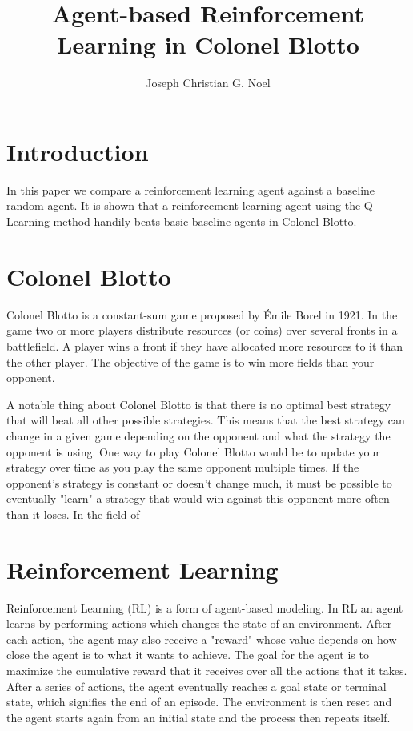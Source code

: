 \documentclass[11pt, oneside]{article}   	%
\title{Agent-based Reinforcement Learning in Colonel Blotto}
\author{Joseph Christian G. Noel}
\date{}							%
\begin{document}
\maketitle

\section{Introduction}

In this paper we compare a reinforcement learning agent against a baseline random agent. It is shown that a reinforcement learning agent using the Q-Learning method handily beats basic baseline agents in Colonel Blotto.

\section{Colonel Blotto}


Colonel Blotto is a constant-sum game proposed by Émile Borel in 1921\cite{Borel1953}. In the game two or more players distribute resources (or coins) over several fronts in a battlefield. A player wins a front if they have allocated more resources to it than the other player. The objective of the game is to win more fields than your opponent.

\hfill

A notable thing about Colonel Blotto is that there is no optimal best strategy that will beat all other possible strategies. This means that the best strategy can change in a given game depending on the opponent and what the strategy the opponent is using. One way to play Colonel Blotto would be to update your strategy over time as you play the same opponent multiple times. If the opponent's strategy is constant or doesn't change much, it must be possible to eventually "learn" a strategy that would win against this opponent more often than it loses. In the field of 

\section{Reinforcement Learning}

Reinforcement Learning (RL) is a form of agent-based modeling. In RL an agent learns by performing actions which changes the state of an environment. After each action, the agent may also receive a "reward" whose value depends on how close the agent is to what it wants to achieve. The goal for the agent is to maximize the cumulative reward that it receives over all the actions that it takes. After a series of actions, the agent eventually reaches a goal state or terminal state, which signifies the end of an episode. The environment is then reset and the agent starts again from an initial state and the process then repeats itself.
\end{document}
